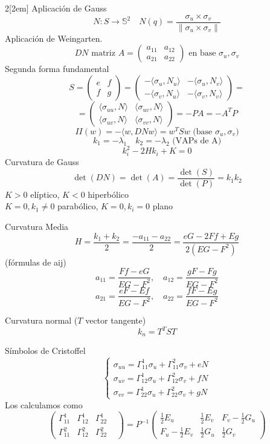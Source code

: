 \documentclass{myclass}
\begin{document}
\begin{multicols}{2}[\columnsep2em]
Aplicación de Gauss
\[
N: S\to \mathbb{S}^2 \quad N(q) = \frac{\sigma _u\times \sigma _v}{\|\sigma _u\times \sigma _v\|}
\]
Aplicación de Weingarten.
\[
  DN \text{ matriz } A = \begin{pmatrix} a_{11} & a_{12} \\ a_{21} & a_{22} \end{pmatrix} \text{ en base }\sigma _u, \sigma _v 
\]
Segunda forma fundamental
\[
  S = \begin{pmatrix} e & f \\ f & g \end{pmatrix} = \begin{pmatrix} -\langle \sigma _u , N_u \rangle & -\langle \sigma _u , N_v \rangle \\ -\langle \sigma _v , N_u \rangle & -\langle \sigma _v , N_v \rangle   \end{pmatrix}= \]
  \[=   \begin{pmatrix} \langle \sigma _{uu} , N \rangle & \langle \sigma _{uv} , N \rangle \\ \langle \sigma _{uv} , N \rangle & \langle \sigma _{vv} , N \rangle   \end{pmatrix} =  -PA = -A^TP 
\]
\[
II(w) = -\langle w, DN w \rangle  = w^TSw \text{ (base } \sigma_u, \sigma _v)
\] 
\[
k_1=-\lambda_1 \quad k_2 = -\lambda_2 \text{  (VAPs de A)}
\] 
\[
  k_i^2 -2Hk_i+K = 0
\] 
Curvatura de Gauss
\[
\det(DN) = \det(A) = \frac{\det(S)}{\det(P)} = k_1k_2
\]
$K>0$ elíptico,  $K<0$ hiperbólico \\
$K=0, k_1\neq 0$ parabólico,  $K=0, k_i=0$ plano

Curvatura Media
\[
H = \frac{k_1+k_2}{2} = \frac{-a_{11}-a_{22}}{2}= \frac{eG-2Ff+Eg}{2(EG-F^2)}
\] 
(fórmulas de aij)
\[
a_{11} = \frac{Ff-eG}{EG-F^2}, \quad a_{12} = \frac{gF-Fg}{EG-F^2}
\] 
\[
  a_{21}=\frac{eF-Ef}{EG-F^2}, \quad a_{22} = \frac{fF-Eg}{EG-F^2}
\] 

Curvatura normal ($T$ vector tangente)
\[
k_n = T^TST
\] 

Símbolos de Cristoffel
  \[
  \begin{cases}
    \sigma _{uu} = \Gamma_{11}^1\sigma _u + \Gamma_{11}^2 \sigma _v + eN \\
    \sigma _{uv} = \Gamma_{12}^1\sigma _u + \Gamma_{12}^2 \sigma _v + fN \\
    \sigma _{vv} = \Gamma_{22}^1\sigma _u + \Gamma_{22}^2 \sigma _v + gN
  \end{cases}
  \]
Los calculamos como
\[
  \begin{pmatrix} \Gamma_{11}^1 & \Gamma_{12}^1 & \Gamma_{22}^1 \\ \Gamma_{11}^2 & \Gamma_{12}^2 & \Gamma_{22}^2 &  \end{pmatrix}  = P^{-1} \begin{pmatrix} \frac{1}{2}E_u & \frac{1}{2}E_v & F_v - \frac{1}{2}G_u \\ F_u - \frac{1}{2}E_v & \frac{1}{2}G_u & \frac{1}{2}G_v \end{pmatrix} 
\]


\end{multicols}
\end{document}
